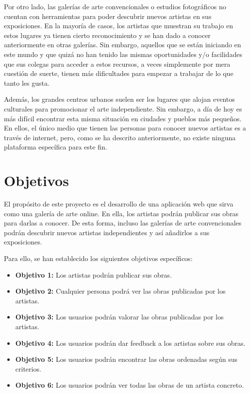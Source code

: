 Por otro lado, las galerías de arte convencionales o estudios fotográficos no cuentan con
herramientas para poder descubrir nuevos artistas en sus exposiciones. En la mayoría de casos,
los artistas que muestran su trabajo en estos lugares ya tienen cierto reconocimiento y se
han dado a conocer anteriormente en otras galerías. Sin embargo, aquellos que se están
iniciando en este mundo y que quizá no han tenido las mismas oportunidades y/o facilidades
que sus colegas para acceder a estos recursos, a veces simplemente por mera cuestión de
suerte, tienen más dificultades para empezar a trabajar de lo que tanto les gusta.  

Además, los grandes centros urbanos suelen ser los lugares que alojan eventos culturales para
promocionar el arte independiente. Sin embargo, a día de hoy es más difícil encontrar esta
misma situación en ciudades y pueblos más pequeños. En ellos, el único medio que tienen las
personas para conocer nuevos artistas es a través de internet, pero, como se ha descrito
anteriormente, no existe ninguna plataforma específica para este fin.

\section{Objetivos}

El propósito de este proyecto es el desarrollo de una aplicación web que sirva como una
galería de arte online. En ella, los artistas podrán publicar sus obras para darlas a
conocer. De esta forma, incluso las galerías de arte convencionales podrán descubrir nuevos
artistas independientes y así añadirlos a sus exposiciones.

Para ello, se han establecido los siguientes objetivos específicos:

\begin{itemize}
    \item \textbf{Objetivo 1:} Los artistas podrán publicar sus obras.
    \item \textbf{Objetivo 2:} Cualquier persona podrá ver las obras publicadas por los
    artistas.
    \item \textbf{Objetivo 3:} Los usuarios podrán valorar las obras publicadas por los
    artistas.
    \item \textbf{Objetivo 4:} Los usuarios podrán dar feedback a los artistas sobre sus
    obras.
    \item \textbf{Objetivo 5:} Los usuarios podrán encontrar las obras ordenadas según sus
    criterios.
    \item \textbf{Objetivo 6:} Los usuarios podrán ver todas las obras de un artista concreto.
\end{itemize}

